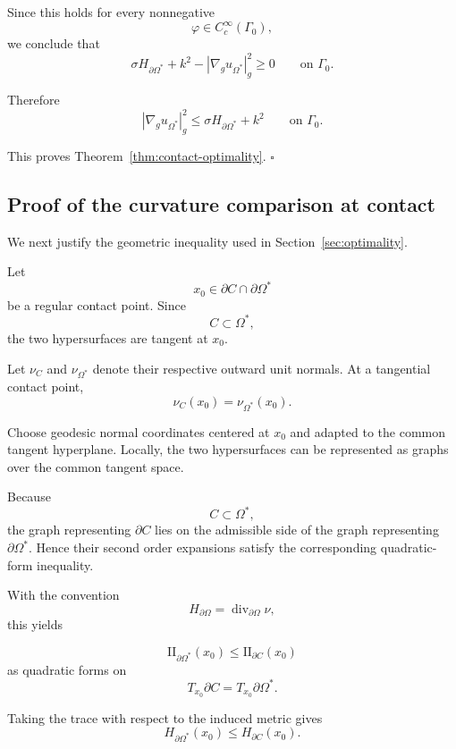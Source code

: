 \documentclass{article}
\renewcommand{\boxed}[1]{#1}
\begin{document}
Since this holds for every nonnegative
\[
\varphi\in C_c^\infty(\Gamma_0),
\]
we conclude that
\[
\sigma H_{\partial\Omega^\ast}
+k^2
-
|\nabla_g u_{\Omega^\ast}|_g^2
\geq0
\qquad\text{on }\Gamma_0.
\]

Therefore
\[
\boxed{
|\nabla_g u_{\Omega^\ast}|_g^2
\leq
\sigma H_{\partial\Omega^\ast}+k^2
\qquad\text{on }\Gamma_0.
}
\]

This proves Theorem~\ref{thm:contact-optimality}.
\hfill$\square$

\subsection{Proof of the curvature comparison at contact}
\label{subsec:proof-curvature-contact}

We next justify the geometric inequality used in
Section~\ref{sec:optimality}.

Let
\[
x_0\in\partial C\cap\partial\Omega^\ast
\]
be a regular contact point. Since
\[
C\subset\Omega^\ast,
\]
the two hypersurfaces are tangent at $x_0$.

Let $\nu_C$ and $\nu_{\Omega^\ast}$ denote their respective outward
unit normals. At a tangential contact point,
\begin{equation}
\nu_C(x_0)
=
\nu_{\Omega^\ast}(x_0).
\label{eq:normals-contact-proof}
\end{equation}

Choose geodesic normal coordinates centered at $x_0$ and adapted to
the common tangent hyperplane. Locally, the two hypersurfaces can be
represented as graphs over the common tangent space.

Because
\[
C\subset\Omega^\ast,
\]
the graph representing $\partial C$ lies on the admissible side of
the graph representing $\partial\Omega^\ast$. Hence their second
order expansions satisfy the corresponding quadratic-form inequality.

With the convention
\[
H_{\partial\Omega}
=
\operatorname{div}_{\partial\Omega}\nu,
\]
this yields

\begin{equation}
\mathrm{II}_{\partial\Omega^\ast}(x_0)
\leq
\mathrm{II}_{\partial C}(x_0)
\end{equation}
as quadratic forms on
\[
T_{x_0}\partial C
=
T_{x_0}\partial\Omega^\ast.
\]

Taking the trace with respect to the induced metric gives
\begin{equation}
\boxed{
H_{\partial\Omega^\ast}(x_0)
\leq
H_{\partial C}(x_0).
}
\label{eq:curvature-comparison-proof}
\end{equation}
\end{document}
